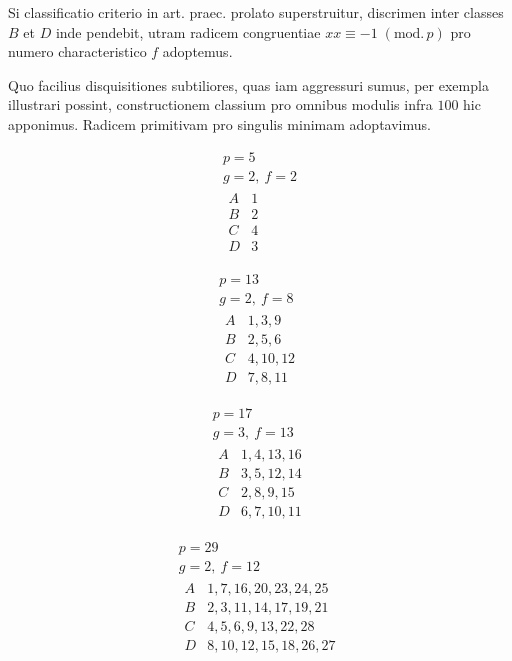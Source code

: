 %
Si classificatio criterio in art. praec. prolato superstruitur, discrimen inter classes $B$ et $D$ inde pendebit, utram radicem congruentiae $xx\equiv-1\; (\mathrm{mod.}\,p)$ pro numero characteristico $f$ adoptemus.

Quo facilius disquisitiones subtiliores, quas iam aggressuri sumus, per exempla illustrari possint, constructionem classium pro omnibus modulis infra $100$ hic apponimus. Radicem primitivam pro singulis minimam adoptavimus.

\[
\begin{gathered}
p=5\\
g=2,\ f=2\\[3pt]
\begin{array}{c|l}
A&1\\
B&2\\
C&4\\
D&3
\end{array}
\end{gathered}
\]

\[
\begin{gathered}
p=13\\
g=2,\ f=8\\[3pt]
\begin{array}{c|l}
A&1,3,9\\
B&2,5,6\\
C&4,10,12\\
D&7,8,11
\end{array}
\end{gathered}
\]

\[
\begin{gathered}
p=17\\
g=3,\ f=13\\[3pt]
\begin{array}{c|l}
A&1,4,13,16\\
B&3,5,12,14\\
C&2,8,9,15\\
D&6,7,10,11
\end{array}
\end{gathered}
\]

\[
\begin{gathered}
p=29\\
g=2,\ f=12\\[3pt]
\begin{array}{c|l}
A&1,7,16,20,23,24,25\\
B&2,3,11,14,17,19,21\\
C&4,5,6,9,13,22,28\\
D&8,10,12,15,18,26,27
\end{array}
\end{gathered}
\]

